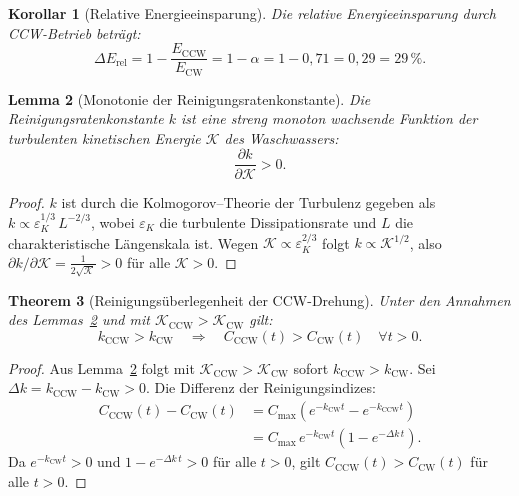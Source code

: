 ﻿\documentclass[12pt,a4paper]{article}
\newtheorem{theorem}{Theorem}[section]
\newtheorem{lemma}[theorem]{Lemma}
\newtheorem{korollar}[theorem]{Korollar}
\theoremstyle{remark}
\newcommand{\CCW}{\mathrm{CCW}}
\newcommand{\CW}{\mathrm{CW}}
\begin{document}
	\begin{korollar}[Relative Energieeinsparung]
		Die relative Energieeinsparung durch CCW-Betrieb beträgt:
		\begin{equation}
			\Delta E_{\mathrm{rel}} = 1 - \frac{E_{\CCW}}{E_{\CW}} = 1 - \alpha = 1 - 0{,}71 = 0{,}29 = 29\,\%.
		\end{equation}
	\end{korollar}
	
	\begin{lemma}[Monotonie der Reinigungsratenkonstante]
		\label{lem:mono}
		Die Reinigungsratenkonstante $k$ ist eine streng monoton wachsende Funktion
		der turbulenten kinetischen Energie $\mathcal{K}$ des Waschwassers:
		\begin{equation}
			\frac{\partial k}{\partial \mathcal{K}} > 0.
		\end{equation}
	\end{lemma}
	
	\begin{proof}
		$k$ ist durch die Kolmogorov--Theorie der Turbulenz gegeben als
		$k \propto \varepsilon_K^{1/3}\,L^{-2/3}$, wobei $\varepsilon_K$ die turbulente
		Dissipationsrate und $L$ die charakteristische Längenskala ist.
		Wegen $\mathcal{K} \propto \varepsilon_K^{2/3}$ folgt $k \propto \mathcal{K}^{1/2}$,
		also $\partial k / \partial\mathcal{K} = \frac{1}{2\sqrt{\mathcal{K}}} > 0$
		für alle $\mathcal{K} > 0$.\hfill
	\end{proof}
	
	\begin{theorem}[Reinigungsüberlegenheit der CCW-Drehung]
		\label{thm:reinigung}
		Unter den Annahmen des Lemmas~\ref{lem:mono} und mit
		$\mathcal{K}_{\CCW} > \mathcal{K}_{\CW}$ gilt:
		\begin{equation}
			k_{\CCW} > k_{\CW}
			\quad\Longrightarrow\quad
			C_{\CCW}(t) > C_{\CW}(t) \quad \forall t > 0.
		\end{equation}
	\end{theorem}
	
	\begin{proof}
		Aus Lemma~\ref{lem:mono} folgt mit $\mathcal{K}_{\CCW} > \mathcal{K}_{\CW}$ sofort
		$k_{\CCW} > k_{\CW}$.
		Sei $\Delta k = k_{\CCW} - k_{\CW} > 0$.
		Die Differenz der Reinigungsindizes:
		\begin{align}
			C_{\CCW}(t) - C_{\CW}(t)
			&= C_{\max}\!\left(e^{-k_{\CW}t} - e^{-k_{\CCW}t}\right)\\
			&= C_{\max}\,e^{-k_{\CW}t}\!\left(1 - e^{-\Delta k\,t}\right).
		\end{align}
		Da $e^{-k_{\CW}t} > 0$ und $1 - e^{-\Delta k\,t} > 0$ für alle $t > 0$,
		gilt $C_{\CCW}(t) > C_{\CW}(t)$ für alle $t > 0$.\hfill
	\end{proof}
	
\end{document}
